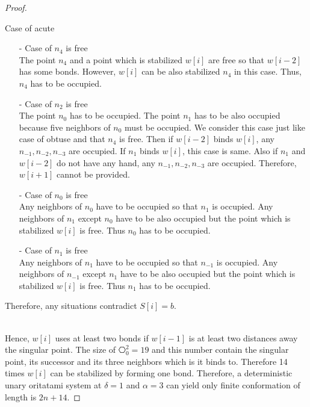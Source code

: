 \begin{proof}
\begin{paragraph}{Case of acute}
\begin{itemize}
\item[-] Case of $n_4$ is free\\
The point $n_4$ and a point which is stabilized $w[i]$ are free so that  $w[i-2]$ has some bonds.
However, $w[i]$ can be also stabilized $n_4$ in this case. Thus, $n_4$ has to be occupied.
\item[-] Case of $n_2$ is free\\
The point $n_0$ has to be occupied. The point $n_1$ has to be also occupied because five neighbors of $n_0$ must be occupied.
We consider this case just like case of obtuse and that $n_4$ is free. Then if $w[i-2]$ binds $w[i]$, any $n_{-1}, n_{-2}, n_{-3}$ are occupied. If $n_1$ binds $w[i]$, this case is same. Also if $n_1$ and $w[i-2]$ do not have any hand, any $n_{-1}, n_{-2}, n_{-3}$ are occupied. Therefore, $w[i+1]$ cannot be provided.
\item[-] Case of $n_0$ is free\\
Any neighbors of $n_0$ have to be occupied so that $n_{1}$ is occupied. Any neighbors of $n_{1}$ except $n_0$ have to be also occupied but the point which is stabilized $w[i]$ is free. Thus $n_0$ has to be occupied. 
\item[-] Case of $n_1$ is free\\
Any neighbors of $n_1$ have to be occupied so that $n_{-1}$ is occupied. Any neighbors of $n_{-1}$ except $n_1$ have to be also occupied but the point which is stabilized $w[i]$ is free. Thus $n_1$ has to be occupied. 
\end{itemize}

Therefore, any situations contradict $S[i] = b$.
\end{paragraph}\\


Hence, $w[i]$ uses at least two bonds if $w[i-1]$ is at least two distances away the singular point.
The size of $ \hexagon^2_0 = 19$ and this number contain the singular point, its successor and its three neighbors which is it binds to. Therefore 14 times  $w[i]$ can be stabilized by forming one bond.
Therefore, a deterministic unary oritatami system at $\delta = 1$ and $\alpha = 3$ can yield only finite conformation of length is $2n + 14$.
\end{proof}


